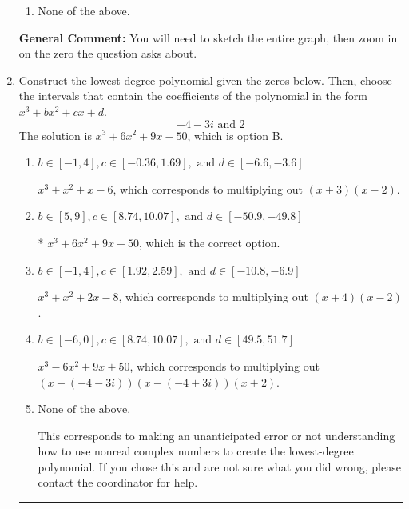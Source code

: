 \documentclass{extbook}[14pt]
\newcommand{\litem}[1]{\item #1

\rule{\textwidth}{0.4pt}}
\begin{document}
\begin{enumerate}
{\begin{enumerate}[label=\Alph*.]
\item None of the above.\end{enumerate}
\textbf{General Comment:} You will need to sketch the entire graph, then zoom in on the zero the question asks about.
}
\litem{
Construct the lowest-degree polynomial given the zeros below. Then, choose the intervals that contain the coefficients of the polynomial in the form $x^3+bx^2+cx+d$.
\[ -4 - 3 i \text{ and } 2 \]The solution is \( x^{3} +6 x^{2} +9 x -50 \), which is option B.\begin{enumerate}[label=\Alph*.]
\item \( b \in [-1, 4], c \in [-0.36, 1.69], \text{ and } d \in [-6.6, -3.6] \)

$x^{3} + x^{2} +x -6$, which corresponds to multiplying out $(x + 3)(x -2)$.
\item \( b \in [5, 9], c \in [8.74, 10.07], \text{ and } d \in [-50.9, -49.8] \)

* $x^{3} +6 x^{2} +9 x -50$, which is the correct option.
\item \( b \in [-1, 4], c \in [1.92, 2.59], \text{ and } d \in [-10.8, -6.9] \)

$x^{3} + x^{2} +2 x -8$, which corresponds to multiplying out $(x + 4)(x -2)$.
\item \( b \in [-6, 0], c \in [8.74, 10.07], \text{ and } d \in [49.5, 51.7] \)

$x^{3} -6 x^{2} +9 x + 50$, which corresponds to multiplying out $(x-(-4 - 3 i))(x-(-4 + 3 i))(x + 2)$.
\item \( \text{None of the above.} \)

This corresponds to making an unanticipated error or not understanding how to use nonreal complex numbers to create the lowest-degree polynomial. If you chose this and are not sure what you did wrong, please contact the coordinator for help.
\end{enumerate}

}
\end{enumerate}
\end{document}

